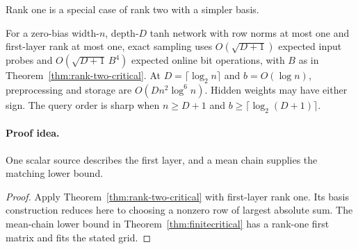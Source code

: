 Rank one is a special case of rank two with a simpler basis.

\begin{corollary}
\label{thm:signed-bottleneck}
For a zero-bias width-$n$, depth-$D$ tanh network with row norms
at most one and first-layer rank at most one, exact sampling uses
$O(\sqrt{D+1})$ expected input probes and
$O(\sqrt{D+1}\,B^4)$ expected online bit operations, with $B$ as in
Theorem~\ref{thm:rank-two-critical}. At $D=\lceil\log_2n\rceil$
and $b=O(\log n)$, preprocessing and storage are $O(Dn^2\log^6n)$.
Hidden weights may have either sign. The query order is sharp when
$n\ge D+1$ and $b\ge\lceil\log_2(D+1)\rceil$.
\end{corollary}
\paragraph{Proof idea.}
One scalar source describes the first layer, and a mean chain supplies
the matching lower bound.

\begin{proof}
Apply Theorem~\ref{thm:rank-two-critical} with first-layer rank one.
Its basis construction reduces here to choosing a nonzero row of
largest absolute sum. The mean-chain lower bound in
Theorem~\ref{thm:finitecritical} has a rank-one first matrix and
fits the stated grid.
\end{proof}
